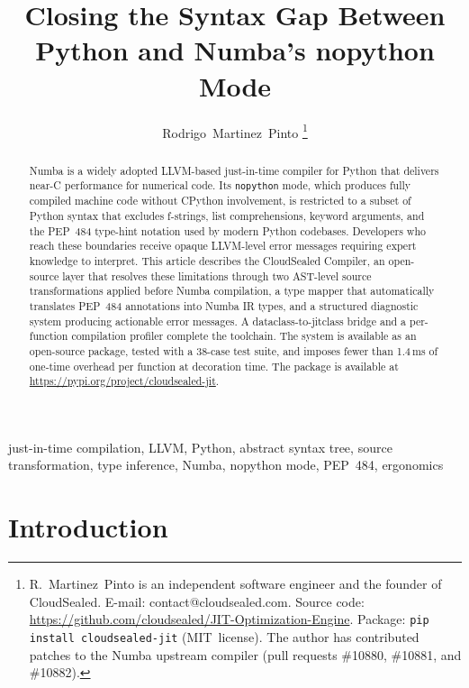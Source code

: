 \documentclass[journal]{IEEEtran}
\begin{document}
\title{Closing the Syntax Gap Between Python and Numba's nopython Mode}

\author{Rodrigo~Martinez~Pinto%
\thanks{R.~Martinez~Pinto is an independent software engineer and the
founder of CloudSealed.
E-mail: contact@cloudsealed.com.
Source code: \url{https://github.com/cloudsealed/JIT-Optimization-Engine}.
Package: \texttt{pip install cloudsealed-jit} (MIT~license).
The author has contributed patches to the Numba upstream compiler
(pull requests \#10880, \#10881, and \#10882).}}

\maketitle

\begin{abstract}
Numba is a widely adopted LLVM-based just-in-time compiler for Python that
delivers near-C performance for numerical code. Its \texttt{nopython} mode,
which produces fully compiled machine code without CPython involvement, is
restricted to a subset of Python syntax that excludes f-strings, list
comprehensions, keyword arguments, and the PEP~484 type-hint notation used
by modern Python codebases. Developers who reach these boundaries receive
opaque LLVM-level error messages requiring expert knowledge to interpret.
This article describes the CloudSealed Compiler, an open-source layer that
resolves these limitations through two AST-level source transformations
applied before Numba compilation, a type mapper that automatically translates
PEP~484 annotations into Numba IR types, and a structured diagnostic system
producing actionable error messages. A dataclass-to-jitclass bridge and a
per-function compilation profiler complete the toolchain. The system is
available as an open-source package, tested with a 38-case test suite,
and imposes fewer than 1.4\,ms of one-time overhead per function at
decoration time. The package is available at
\url{https://pypi.org/project/cloudsealed-jit}.
\end{abstract}

\begin{IEEEkeywords}
just-in-time compilation, LLVM, Python, abstract syntax tree, source
transformation, type inference, Numba, nopython mode, PEP~484, ergonomics
\end{IEEEkeywords}

\section{Introduction}
\end{document}
